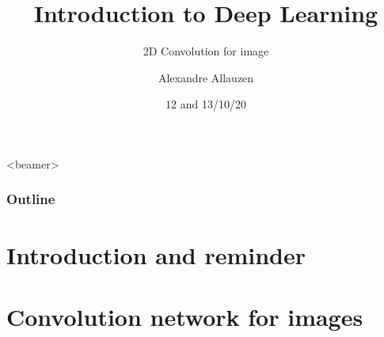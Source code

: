 \documentclass[10pt]{beamer}
\title[IDL@BME-BIN] %
{Introduction to Deep Learning}
\subtitle{2D Convolution for image }
\author[A. Allauzen] %
{Alexandre Allauzen}
\institute[ESPCI/Dauphine/PSL] %
{
\texttt{[image: ../logos/espci\_blue.png]}\hfill
\raisebox{1.75ex}{\texttt{[image: ../logos/dauphine.png]}}\\
\hfill\texttt{[image: ../logos/logomiles\_white.pdf]}
}
\date{12 and 13/10/20} %
\begin{document}

\begin{frame}
  \titlepage
\end{frame}

\begin{frame}<beamer>
  \frametitle{Outline}
  \tableofcontents
\end{frame}
 






\section{Introduction and reminder}



\section{Convolution network for images}





{\footnotesize }
\end{document}
